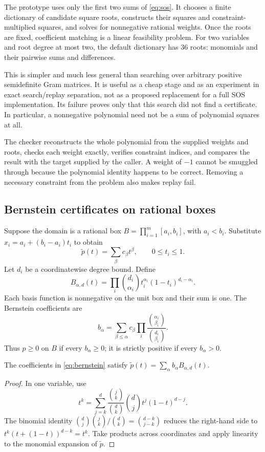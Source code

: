 The prototype uses only the first two sums of \eqref{eq:sos}. It chooses a
finite dictionary of candidate square roots, constructs their squares and
constraint-multiplied squares, and solves for nonnegative rational weights.
Once the roots are fixed, coefficient matching is a linear feasibility
problem. For two variables and root degree at most two, the default dictionary
has 36 roots: monomials and their pairwise sums and differences.

This is simpler and much less general than searching over arbitrary positive
semidefinite Gram matrices. It is useful as a cheap stage and as an experiment
in exact search/replay separation, not as a proposed replacement for a full
SOS implementation. Its failure proves only that this search did not find a
certificate. In particular, a nonnegative polynomial need not be a sum of
polynomial squares at all.

The checker reconstructs the whole polynomial from the supplied weights and
roots, checks each weight exactly, verifies constraint indices, and compares
the result with the target supplied by the caller. A weight of $-1$ cannot be
smuggled through because the polynomial identity happens to be correct.
Removing a necessary constraint from the problem also makes replay fail.

\subsection{Bernstein certificates on rational boxes}

Suppose the domain is a rational box
$B=\prod_{i=1}^m[a_i,b_i]$, with $a_i<b_i$. Substitute
$x_i=a_i+(b_i-a_i)t_i$ to obtain
\[
\widetilde p(t)=\sum_\beta c_\beta t^\beta,\qquad 0\le t_i\le1.
\]
Let $d_i$ be a coordinatewise degree bound. Define
\[
B_{\alpha,d}(t)=\prod_i\binom{d_i}{\alpha_i}
 t_i^{\alpha_i}(1-t_i)^{d_i-\alpha_i}.
\]
Each basis function is nonnegative on the unit box and their sum is one.
The Bernstein coefficients are
\begin{equation}\label{eq:bernstein}
b_\alpha=\sum_{\beta\le\alpha}c_\beta
 \prod_i\frac{\binom{\alpha_i}{\beta_i}}{\binom{d_i}{\beta_i}}.
\end{equation}
Thus $p\ge0$ on $B$ if every $b_\alpha\ge0$; it is strictly positive if every
$b_\alpha>0$.

\begin{proposition}
The coefficients in \eqref{eq:bernstein} satisfy
$\widetilde p(t)=\sum_\alpha b_\alpha B_{\alpha,d}(t)$.
\end{proposition}
\begin{proof}
In one variable, use
\[
 t^k=\sum_{j=k}^d
 \frac{\binom{j}{k}}{\binom{d}{k}}
 \binom{d}{j}t^j(1-t)^{d-j}.
\]
The binomial identity
$\binom{d}{j}\binom{j}{k}/\binom{d}{k}=\binom{d-k}{j-k}$
reduces the right-hand side to
$t^k(t+(1-t))^{d-k}=t^k$. Take products across coordinates and apply linearity
to the monomial expansion of $\widetilde p$.
\end{proof}

